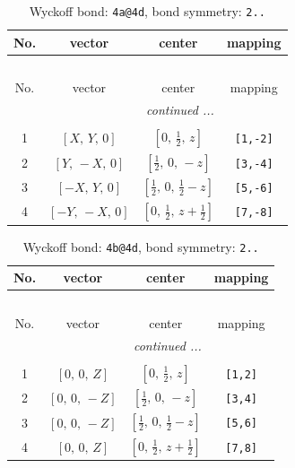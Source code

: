 \documentclass[fleqn,8pt]{jsarticle}
\begin{document}
\begin{longtable}{cccc}
\caption{Wyckoff bond: {\tt 4a@4d}, bond symmetry: {\tt 2..}}
 \\
 \hline \hline
No. & vector & center & mapping \\ \hline \endfirsthead

\multicolumn{3}{l}{\tablename\ \thetable{}} \\
 \hline \hline
No. & vector & center & mapping \\ \hline \endhead

 \hline \hline
\multicolumn{3}{r}{\footnotesize\it continued ...} \\ \endfoot

 \hline \hline
\multicolumn{3}{r}{} \\ \endlastfoot

1 & $\left[ X,\, Y,\, 0 \right]$ & $\left[ 0,\, \frac{1}{2},\, z \right]$ & {\tt [1,-2]} \\ \hline
2 & $\left[ Y,\, - X,\, 0 \right]$ & $\left[ \frac{1}{2},\, 0,\, - z \right]$ & {\tt [3,-4]} \\ \hline
3 & $\left[ - X,\, Y,\, 0 \right]$ & $\left[ \frac{1}{2},\, 0,\, \frac{1}{2} - z \right]$ & {\tt [5,-6]} \\ \hline
4 & $\left[ - Y,\, - X,\, 0 \right]$ & $\left[ 0,\, \frac{1}{2},\, z + \frac{1}{2} \right]$ & {\tt [7,-8]} \\
\end{longtable}
\renewcommand{\arraystretch}{1.2}
\begin{longtable}{cccc}
\caption{Wyckoff bond: {\tt 4b@4d}, bond symmetry: {\tt 2..}}
 \\
 \hline \hline
No. & vector & center & mapping \\ \hline \endfirsthead

\multicolumn{3}{l}{\tablename\ \thetable{}} \\
 \hline \hline
No. & vector & center & mapping \\ \hline \endhead

 \hline \hline
\multicolumn{3}{r}{\footnotesize\it continued ...} \\ \endfoot

 \hline \hline
\multicolumn{3}{r}{} \\ \endlastfoot

1 & $\left[ 0,\, 0,\, Z \right]$ & $\left[ 0,\, \frac{1}{2},\, z \right]$ & {\tt [1,2]} \\ \hline
2 & $\left[ 0,\, 0,\, - Z \right]$ & $\left[ \frac{1}{2},\, 0,\, - z \right]$ & {\tt [3,4]} \\ \hline
3 & $\left[ 0,\, 0,\, - Z \right]$ & $\left[ \frac{1}{2},\, 0,\, \frac{1}{2} - z \right]$ & {\tt [5,6]} \\ \hline
4 & $\left[ 0,\, 0,\, Z \right]$ & $\left[ 0,\, \frac{1}{2},\, z + \frac{1}{2} \right]$ & {\tt [7,8]} \\
\end{longtable}
\end{document}
